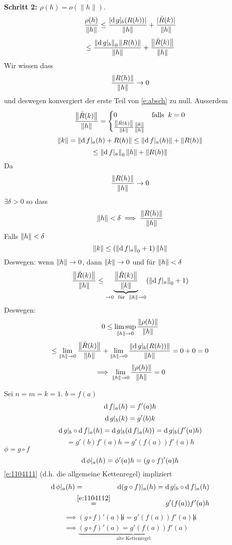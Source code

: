 \begin{Bew}
\medskip
{\bf Schritt 2: $\rho (h) = o (\|h\|)$}.
 \[\frac{\rho(h)}{\left\| h \right\|}\leq\frac{\mathopen| \operatorname{d} g|_b (R(h)) \mathclose|}{\left\| h \right\|}+\frac{\mathopen| \bar R(k) \mathclose|}{\left\| h \right\|}\]
 \begin{equation}\label{e:absch}
\leq\frac{\left\| \operatorname{d} g|_b \right\|_0\left\| R(h) \right\|}{\left\| h \right\|}+\frac{\left\| \bar R(k) \right\|}{\left\| h \right\|}
\end{equation}
Wir wissen dass   
\[\frac{\left\| R(h) \right\|}{\left\| h \right\|}\rightarrow 0\]
und deswegen konvergiert der erste Teil von \eqref{e:absch} zu null. Ausserdem
  \[\frac{\left\| \bar R(k) \right\|}{\left\| h \right\|} = \begin{cases}
    0 & \text{falls}\hspace{2mm} k=0\\
    \frac{\left\| \bar R(k) \right\|}{\left\| k \right\|}\frac{\left\| k \right\|}{\left\| h \right\|}
  \end{cases}\]
  \[\left\| k \right\|=\left\| \operatorname{d} f|_a(h)+R(h) \right\|\leq \left\| \operatorname{d} f|_a(h) \right\|+\left\| R(h) \right\|\]
  \begin{equation}
    \label{e:1104110}
    \leq \left\| \operatorname{d} f|_a \right\|_0\left\| h \right\|+\left\| R(h) \right\|
  \end{equation}
Da
  \[\frac{\left\| R(h) \right\|}{\left\| h \right\|}\rightarrow 0\]
  $\exists \delta>0$ so dass
  \[\left\| h \right\|<\delta\implies \frac{\left\| R(h) \right\|}{\left\| h \right\|}\]
  Falls $\left\| h \right\|<\delta$
  \[\|k\|\leq (\left\| \operatorname{d} f|_a \right\|_0+1)\left\| h \right\|\]
  Deswegen: wenn $\left\| h \right\|\rightarrow 0$, dann $\left\| k \right\|\rightarrow 0$ und für $\left\| h \right\|<\delta$
  \[\frac{\left\| \bar R(k) \right\|}{\left\| h \right\|}\leq \underbrace{\frac{\left\| \bar R(k) \right\|}{\left\| k \right\|}}_{\rightarrow 0\hspace{2mm}\text{für}\hspace{2mm}\left\| h \right\|\rightarrow 0}(\left\| \operatorname{d} f|_a \right\|_0+1)\]
  Deswegen:
  \[0\leq \limsup_{\left\| h \right\|\rightarrow 0}\frac{\left\| \rho(h) \right\|}{\left\| h \right\|}\]
  \[\leq\displaystyle\lim_{\left\| h \right\|\rightarrow0}\frac{\left\| \bar R(k) \right\|}{\left\| h \right\|}+\displaystyle\lim_{\left\| h \right\|\rightarrow0}\frac{\left\| \operatorname{d} g|_b(R(h)) \right\|}{\left\| h \right\|}=0+0=0\]
  \[\implies \displaystyle\lim_{\left\| h \right\|\rightarrow0}\frac{\left\| \rho(h) \right\|}{\left\| h \right\|}=0\]
\end{Bew}
\begin{Bem} Sei $n=m=k=1$. $b=f(a)$
  \[\operatorname{d} f|_a(h)=f'(a)h\]
  \[\operatorname{d} g|_b(k)=g'(b)k\]
  \[\operatorname{d} g|_b\circ \operatorname{d} f|_a( h)=\operatorname{d} g|_b(\operatorname{d} f|_a(h))=\operatorname{d} g|_b(f'(a)h)\]
  \begin{equation}
    \label{e:1104112}
    =g'(b)f'(a)h=g'(f(a))f'(a)h
  \end{equation}
  $\phi=g\circ f$
  \[\operatorname{d} \phi|_a(h)=\phi'(a)h=(g\circ f)'(a)h\]
  \eqref{e:1104111} (d.h. die allgemeine Kettenregel) impliziert
  \begin{eqnarray*}
    \operatorname{d} \phi|_a(h)&=&\operatorname{d} (g\circ f)|_a(h)
    =\operatorname{d} g|_b\circ \operatorname{d} f|_a(h)\\
&\stackrel{\eqref{e:1104112}}{=}&g'(f(a))f'(a)h
  \end{eqnarray*}
  \begin{eqnarray*}
    \implies(g\circ f)'(a)\not h=g'(f(a))f'(a)\not h\\
    \implies \underbrace{(g\circ f)'(a)=g'(f(a))f'(a)}_{\text{alte Kettenregel}}
  \end{eqnarray*}
\end{Bem}
